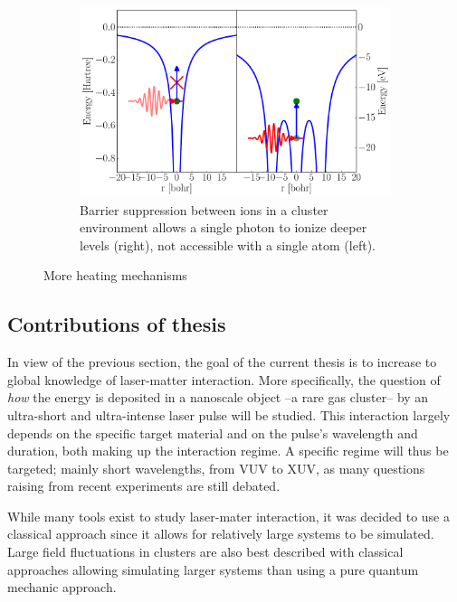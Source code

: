 \begin{figure}
    \begin{subfigure}{\figurewidth}
        \centering
        \includegraphics[width=\textwidth]{figures/heating_barrier_sup}
        \caption{Barrier suppression between ions in a cluster environment allows
                 a single photon to ionize deeper levels (right), not accessible
                 with a single atom (left).}
        \label{fig:heating:barrier}
    \end{subfigure}
 \caption{More heating mechanisms}
 \label{fig:heating}
\end{figure}



\clearpage
\subsection{Contributions of thesis}

In view of the previous section, the goal of the current thesis is to increase
to global knowledge of laser-matter interaction. More specifically, the
question of \textit{how} the energy is deposited in a nanoscale object
--a rare gas cluster-- by an
ultra-short and ultra-intense laser pulse will be studied. This interaction
largely depends on the specific target material and on the pulse's wavelength
and duration, both making up the interaction regime. A specific regime will
thus be targeted; mainly short wavelengths, from VUV to XUV, as many questions
raising from recent experiments are still debated.

While many tools exist to study laser-mater interaction, it was decided to use
a classical approach since it allows for relatively large systems to be
simulated. Large field fluctuations in clusters are also best described with
classical approaches\cite{Fennel2010} allowing simulating larger systems than
using a pure quantum mechanic approach.


